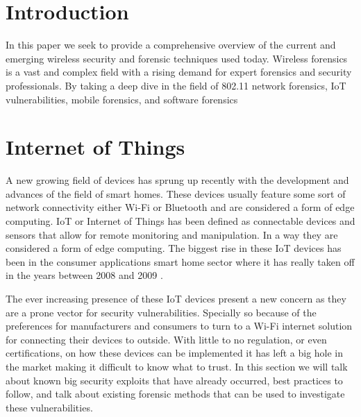 \documentclass[acmlarge]{style/acmart}
\begin{document}


\maketitle

\section{Introduction}

In this paper we seek to provide a comprehensive overview of the current and emerging wireless security and forensic techniques used today. Wireless forensics is a vast and complex field with a rising demand for expert forensics and security professionals. By taking a deep dive in the field of 802.11 network forensics, IoT vulnerabilities, mobile forensics, and software forensics 

\section{Internet of Things}

A new growing field of devices has sprung up recently with the development and advances of the field of smart homes. These devices usually feature some sort of network connectivity either Wi-Fi or Bluetooth and are considered a form of edge computing. IoT or Internet of Things has been defined as connectable devices and sensors that allow for remote monitoring and manipulation. In a way they are considered a form of edge computing. The biggest rise in these IoT devices has been in the consumer applications smart home sector where it has really taken off in the years between 2008 and 2009 \cite{evans_iot_2011}.

The ever increasing presence of these IoT devices present a new concern as they are a prone vector for security vulnerabilities. Specially so because of the preferences for manufacturers and consumers to turn to a Wi-Fi internet solution for connecting their devices to outside. With little to no regulation, or even certifications, on how these devices can be implemented it has left a big hole in the market making it difficult to know what to trust. 
In this section we will talk about known big security exploits that have already occurred, best practices to follow, and talk about existing forensic methods that can be used to investigate these vulnerabilities.
\end{document}
